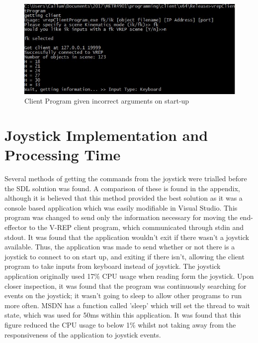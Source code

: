 \documentclass[12pt,openany,a4paper]{book}
\begin{document}
\begin{center}
\begin{figure}[htb]
  \includegraphics[width=\linewidth]{client_prompted_start_up.jpg}
\caption{ Client Program given incorrect arguments on start-up }
\end{figure}
\end{center}

\section{Joystick Implementation and Processing Time}
Several methods of getting the commands from the joystick were trialled before the SDL solution was found. A comparison of these is found in the appendix, although it is believed that this method provided the best solution as it was a console based application which was easily modifiable in Visual Studio. This program was changed to send only the information necessary for moving the end-effector to the V-REP client program, which communicated through stdin and stdout. It was found that the application wouldn't exit if there wasn't a joystick available. Thus, the application was made to send whether or not there is a joystick to connect to on start up, and exiting if there isn't, allowing the client program to take inputs from keyboard instead of joystick. The joystick application originally used 17\% CPU usage when reading form the joystick. Upon closer inspection, it was found that the program was continuously searching for events on the joystick; it wasn't going to sleep to allow other programs to run more often. MSDN has a function called 'sleep' which will set the thread to wait state, which was used for 50ms within this application. It was found that this figure reduced the CPU usage to below 1\% whilst not taking away from the responsiveness of the application to joystick events.
\end{document}
